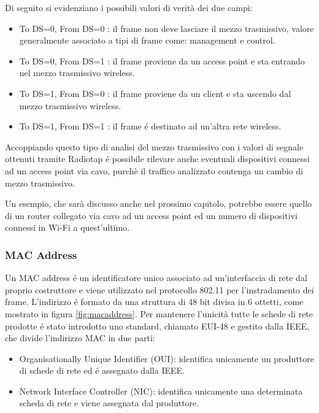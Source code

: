 Di seguito si evidenziano i possibili valori di verit\`a dei due campi:

\begin{itemize}
	\item To DS=0, From DS=0 : il frame non deve lasciare il mezzo trasmissivo, valore generalmente associato a tipi di frame come: management e control.
	\item To DS=0, From DS=1 : il frame proviene da un access point e sta entrando nel mezzo trasmissivo wireless.
	\item To DS=1, From DS=0 : il frame proviene da un client e sta uscendo dal mezzo trasmissivo wireless.
	\item To DS=1, From DS=1 : il frame \'e destinato ad un'altra rete wireless.
\end{itemize}

Accoppiando questo tipo di analisi del mezzo trasmissivo con i valori di segnale ottenuti tramite Radiotap \'e possibile rilevare anche eventuali dispositivi connessi ad un access point via cavo, purch\`e il traffico analizzato contenga un cambio di mezzo trasmissivo.

Un esempio, che sar\`a discusso anche nel prossimo capitolo, potrebbe essere quello di un router collegato via cavo ad un access point ed un numero di dispositivi connessi in Wi-Fi a quest'ultimo.

\newpage

\subsubsection{MAC Address}

Un MAC address \'e un identificatore unico associato ad un'interfaccia di rete dal proprio costruttore e viene utilizzato nel protocollo 802.11 per l'instradamento dei frame.
L'indirizzo \'e formato da una struttura di 48 bit divisa in 6 ottetti, come mostrato in figura \ref{fig:macaddress}.
Per mantenere l'unicit\`a tutte le schede di rete prodotte \'e stato introdotto uno standard, chiamato EUI-48 e gestito dalla IEEE, che divide l'indirizzo MAC in due parti:
\begin{itemize}
	\item Organisationally Unique Identifier (OUI): identifica unicamente un produttore di schede di rete ed \'e assegnato dalla IEEE.
	\item Network Interface Controller (NIC): identifica unicamente una determinata scheda di rete e viene assegnata dal produttore.
\end{itemize}

